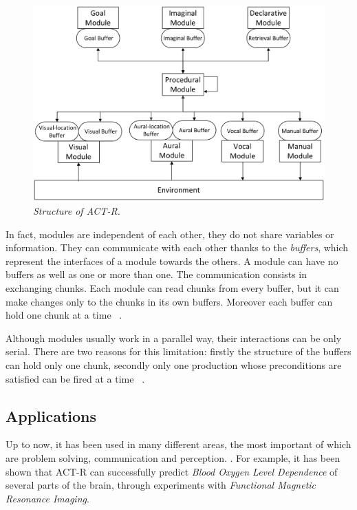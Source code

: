 	\begin{figure}[h]
	  \begin{center} 
	    \includegraphics[scale=0.25]{images/ch_01/actr.eps}
	  \end{center} 
	  \caption{\textit{Structure of ACT-R.}}  
	  \label{fig:modulesActr}
	\end{figure}
	
	
	In fact, modules are independent of each other, they do not share variables or information. They can communicate with each other thanks to the \emph{buffers}, which represent the interfaces of a module towards the others. A module can have no buffers as well as one or more than one. The communication consists in exchanging chunks. Each module can read chunks from every buffer, but it can make changes only to the chunks in its own buffers. Moreover each buffer can hold one chunk at a time ~\cite{actr6refman}. 

	Although modules usually work in a parallel way, their interactions can be only serial.
	There are two reasons for this limitation: firstly the structure of the buffers can hold only one chunk, secondly only one production whose preconditions are satisfied can be fired at a time ~\cite{actr6refman}.
	
	\subsection{Applications}
	Up to now, it has been used in many different areas, the most important of which are problem solving, communication and perception. .
	For example, it has been shown that \mbox{ACT-R} can successfully predict \emph{Blood Oxygen Level Dependence} of several parts of the brain, through experiments with \emph{Functional Magnetic Resonance Imaging}. 
	
